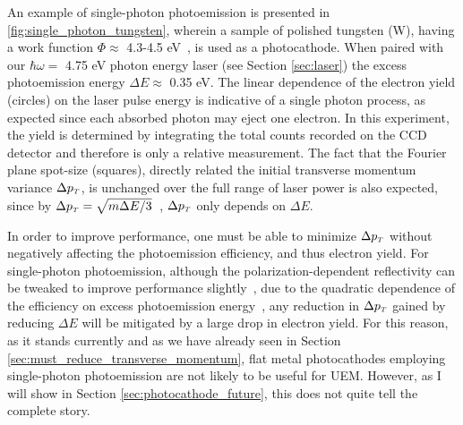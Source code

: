 An example of single-photon photoemission is presented in \ref{fig:single_photon_tungsten}, wherein a sample of polished tungsten (W), having a work function $\Phi \approx $ 4.3-4.5 eV~\cite{yen_thermally_1980}, is used as a photocathode.
When paired with our $\hbar \omega = $ 4.75 eV photon energy laser (see Section \ref{sec:laser}) the excess photoemission energy $\Delta E \approx $ 0.35 eV.
The linear dependence of the electron yield (circles) on the laser pulse energy is indicative of a single photon process, as expected since each absorbed photon may eject one electron.
In this experiment, the yield is determined by integrating the total counts recorded on the CCD detector and therefore is only a relative measurement.
The fact that the Fourier plane spot-size (squares), directly related the initial transverse momentum variance $\Delta p_{{\scriptscriptstyle T}}$, is unchanged over the full range of laser power is also expected, since by $\Delta p_{{\scriptscriptstyle T}} = \sqrt{ m \Delta E / 3 } $~\cite{dowell_quantum_2009}, $\Delta p_{{\scriptscriptstyle T}}$ only depends on $\Delta E$.

In order to improve performance, one must be able to minimize $\Delta p_{{\scriptscriptstyle T}}$ without negatively affecting the photoemission efficiency, and thus electron yield.
For single-photon photoemission, although the polarization-dependent reflectivity can be tweaked to improve performance slightly~\cite{berger_dc_2009}, due to the quadratic dependence of the efficiency on excess photoemission energy~\cite{shalaev_electron_1994}, any reduction in $\Delta p_{{\scriptscriptstyle T}}$ gained by reducing $\Delta E$ will be mitigated by a large drop in electron yield.
For this reason, as it stands currently and as we have already seen in Section \ref{sec:must_reduce_transverse_momentum}, flat metal photocathodes employing single-photon photoemission are not likely to be useful for UEM.
However, as I will show in Section \ref{sec:photocathode_future}, this does not quite tell the complete story.

